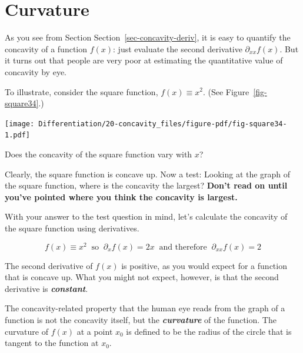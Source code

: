 \documentclass[
  letterpaper,
  DIV=11,
  numbers=noendperiod,
  oneside]{scrreprt}
\begin{document}

\hypertarget{sec-curvature-definition}{%
\section{Curvature}\label{sec-curvature-definition}}

As you see from Section Section~\ref{sec-concavity-deriv}, it is easy to
quantify the concavity of a function \(f(x)\): just evaluate the second
derivative \(\partial_{xx} f(x)\). But it turns out that people are very
poor at estimating the quantitative value of concavity by eye.

To illustrate, consider the square function, \(f(x) \equiv x^2\). (See
Figure~\ref{fig-square34}.)

\begin{marginfigure}

{\centering \texttt{[image: Differentiation/20-concavity\_files/figure-pdf/fig-square34-1.pdf]}

}

\caption{\label{fig-square34}Does the concavity of the square function
vary with \(x\)?}

\end{marginfigure}

Clearly, the square function is concave up. Now a test: Looking at the
graph of the square function, where is the concavity the largest?
\textbf{Don't read on until you've pointed where you think the concavity
is largest.}

With your answer to the test question in mind, let's calculate the
concavity of the square function using derivatives.

\[f(x) \equiv x^2\ \text{      so     }\ 
\partial_x f(x) = 2 x\ \text{     and therefore     }\ \partial_{xx} f(x) = 2\]

The second derivative of \(f(x)\) is positive, as you would expect for a
function that is concave up. What you might not expect, however, is that
the second derivative is \textbf{\emph{constant}}.

The concavity-related property that the human eye reads from the graph
of a function is not the concavity itself, but the
\textbf{\emph{curvature}} of the function. The curvature of \(f(x)\) at
a point \(x_0\) is defined to be the radius of the circle that is
tangent to the function at \(x_0\).
\end{document}
